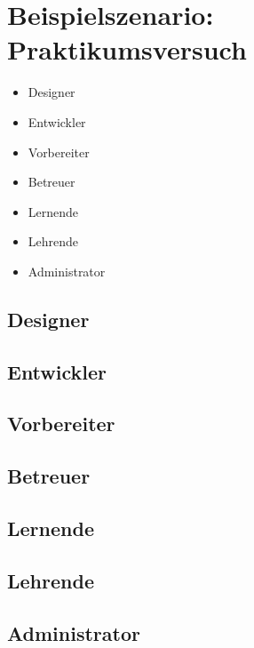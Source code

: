 \section{Beispielszenario: Praktikumsversuch} \label{beispielszenario}

\begin{itemize}
    \item Designer
    \item Entwickler
    \item Vorbereiter
    \item Betreuer
    \item Lernende
    \item Lehrende
    \item Administrator
\end{itemize}

\subsection{Designer}

\subsection{Entwickler}

\subsection{Vorbereiter}

\subsection{Betreuer}

\subsection{Lernende}

\subsection{Lehrende}

\subsection{Administrator}